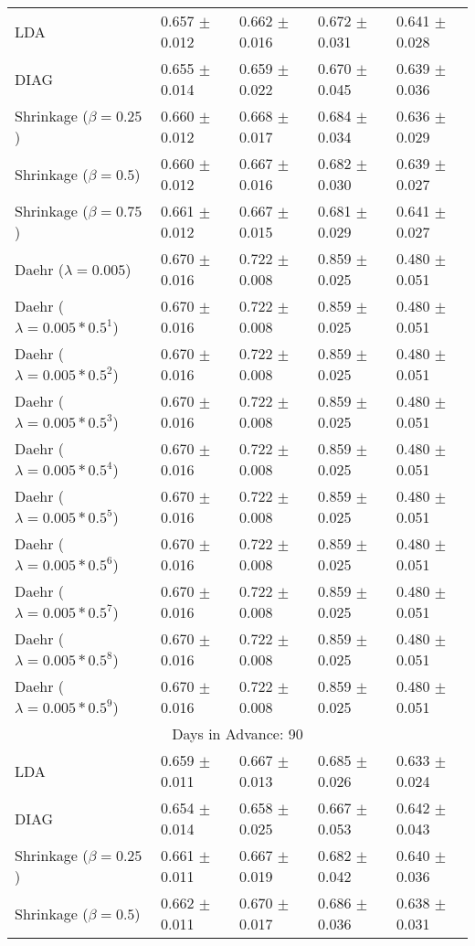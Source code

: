 \begin{table}
\begin{tabular}{*{5}{l}}
LDA&0.657 $\pm$ 0.012&0.662 $\pm$ 0.016&0.672 $\pm$ 0.031&0.641 $\pm$ 0.028\\
DIAG&0.655 $\pm$ 0.014&0.659 $\pm$ 0.022&0.670 $\pm$ 0.045&0.639 $\pm$ 0.036\\
Shrinkage ($\beta=0.25$)&0.660 $\pm$ 0.012&0.668 $\pm$ 0.017&0.684 $\pm$ 0.034&0.636 $\pm$ 0.029\\
Shrinkage ($\beta=0.5$)&0.660 $\pm$ 0.012&0.667 $\pm$ 0.016&0.682 $\pm$ 0.030&0.639 $\pm$ 0.027\\
Shrinkage ($\beta=0.75$)&0.661 $\pm$ 0.012&0.667 $\pm$ 0.015&0.681 $\pm$ 0.029&0.641 $\pm$ 0.027\\
Daehr ($\lambda=0.005$)&0.670 $\pm$ 0.016&0.722 $\pm$ 0.008&0.859 $\pm$ 0.025&0.480 $\pm$ 0.051\\
Daehr ($\lambda=0.005*0.5^1$)&0.670 $\pm$ 0.016&0.722 $\pm$ 0.008&0.859 $\pm$ 0.025&0.480 $\pm$ 0.051\\
Daehr ($\lambda=0.005*0.5^2$)&0.670 $\pm$ 0.016&0.722 $\pm$ 0.008&0.859 $\pm$ 0.025&0.480 $\pm$ 0.051\\
Daehr ($\lambda=0.005*0.5^3$)&0.670 $\pm$ 0.016&0.722 $\pm$ 0.008&0.859 $\pm$ 0.025&0.480 $\pm$ 0.051\\
Daehr ($\lambda=0.005*0.5^4$)&0.670 $\pm$ 0.016&0.722 $\pm$ 0.008&0.859 $\pm$ 0.025&0.480 $\pm$ 0.051\\
Daehr ($\lambda=0.005*0.5^5$)&0.670 $\pm$ 0.016&0.722 $\pm$ 0.008&0.859 $\pm$ 0.025&0.480 $\pm$ 0.051\\
Daehr ($\lambda=0.005*0.5^6$)&0.670 $\pm$ 0.016&0.722 $\pm$ 0.008&0.859 $\pm$ 0.025&0.480 $\pm$ 0.051\\
Daehr ($\lambda=0.005*0.5^7$)&0.670 $\pm$ 0.016&0.722 $\pm$ 0.008&0.859 $\pm$ 0.025&0.480 $\pm$ 0.051\\
Daehr ($\lambda=0.005*0.5^8$)&0.670 $\pm$ 0.016&0.722 $\pm$ 0.008&0.859 $\pm$ 0.025&0.480 $\pm$ 0.051\\
Daehr ($\lambda=0.005*0.5^9$)&0.670 $\pm$ 0.016&0.722 $\pm$ 0.008&0.859 $\pm$ 0.025&0.480 $\pm$ 0.051\\
\hline\multicolumn{5}{c}{  Days in Advance: 90}\\\hline
LDA&0.659 $\pm$ 0.011&0.667 $\pm$ 0.013&0.685 $\pm$ 0.026&0.633 $\pm$ 0.024\\
DIAG&0.654 $\pm$ 0.014&0.658 $\pm$ 0.025&0.667 $\pm$ 0.053&0.642 $\pm$ 0.043\\
Shrinkage ($\beta=0.25$)&0.661 $\pm$ 0.011&0.667 $\pm$ 0.019&0.682 $\pm$ 0.042&0.640 $\pm$ 0.036\\
Shrinkage ($\beta=0.5$)&0.662 $\pm$ 0.011&0.670 $\pm$ 0.017&0.686 $\pm$ 0.036&0.638 $\pm$ 0.031\\

\end{tabular}
\end{table}

